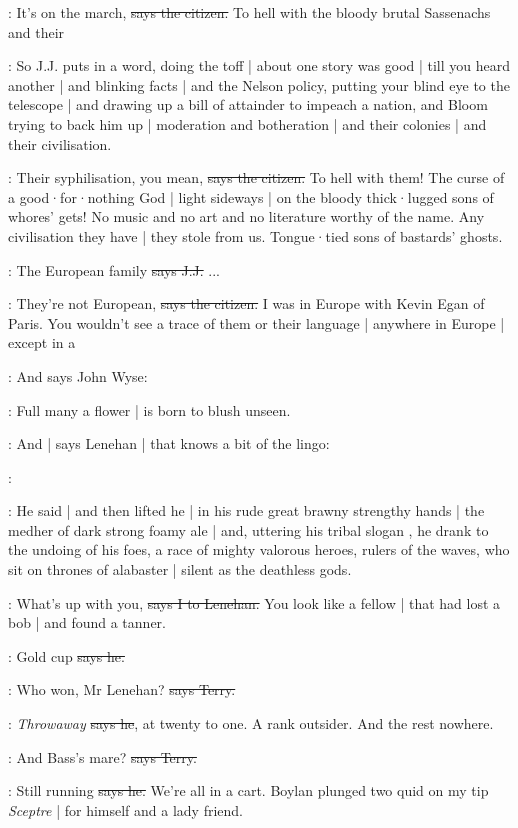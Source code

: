 \citizen:
It's on the march,
\sout{says the citizen.}
To hell with the bloody brutal Sassenachs and their 

\Nq:
So J.J. puts in a word,
doing the toff |
about one story was good |
till you heard another |
and blinking facts |
and the Nelson policy,
putting your blind eye to the telescope |
and drawing up a bill of attainder to impeach a nation,
and Bloom trying to back him up |
moderation and botheration |
and their colonies |
and their civilisation.

\citizen:
Their syphilisation,
you mean,
\sout{says the citizen.}
To hell with them!
The curse of a good·for·nothing God |
light sideways |
on the bloody thick·lugged sons of whores' gets!
No music and no art and no literature worthy of the name.
Any civilisation they have |
they stole from us.
Tongue·tied sons of bastards' ghosts.

\jjom:
The European family
\sout{says J.J.}
...

\citizen:
They're not European,
\sout{says the citizen.}
I was in Europe with Kevin Egan of Paris.
You wouldn't see a trace of them or their language |
anywhere in Europe |
except in a 

\Nq:
And says John Wyse:

\johnwyse:
Full many a flower |
is born to blush unseen.

\Nq:
And |
says Lenehan |
that knows a bit of the lingo:

\lenehan:

:
He said |
and then lifted he
 |
in his rude great brawny strengthy hands |
the medher of dark strong foamy ale |
and,
uttering his tribal slogan ,
he drank to the undoing of his foes,
a race of mighty valorous heroes,
rulers of the waves,
who sit on thrones of alabaster |
silent as the deathless gods.

:
What's up with you,
\sout{says I to Lenehan.}
You look like a fellow |
that had lost a bob |
and found a tanner.

\lenehan:
Gold cup
\sout{says he.}

\terry:
Who won,
Mr Lenehan?
\sout{says Terry.}

\lenehan:
\emph{Throwaway}
\sout{says he},
at twenty to one.
A rank outsider.
And the rest nowhere.%

\terry:
And Bass's mare?
\sout{says Terry.}

\lenehan:
Still running
\sout{says he.}
We're all in a cart.
Boylan plunged two quid on my tip \emph{Sceptre} |
for himself and a lady friend.

